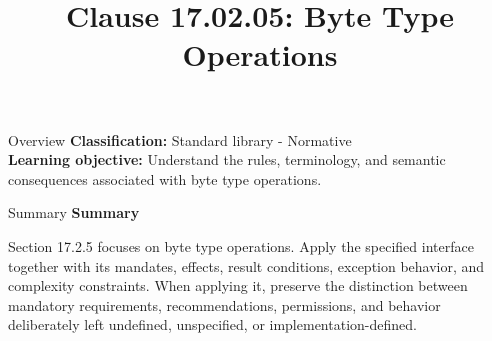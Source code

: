 \documentclass[10pt,letterpaper]{article}
\title{Clause 17.02.05: Byte Type Operations}
\author{}
\date{}
\begin{document}
\maketitle
\begin{CornellOverviewBox}{Overview}
\textbf{Classification:} Standard library - Normative\\[2pt]
\textbf{Learning objective:} Understand the rules, terminology, and semantic consequences associated with byte type operations.
\end{CornellOverviewBox}\begin{CornellSummaryBox}{Summary}
{\sffamily\bfseries\color{Accent} Summary}\par\vspace{3pt}Section 17.2.5 focuses on byte type operations. Apply the specified interface together with its mandates, effects, result conditions, exception behavior, and complexity constraints. When applying it, preserve the distinction between mandatory requirements, recommendations, permissions, and behavior deliberately left undefined, unspecified, or implementation-defined.
\end{CornellSummaryBox}
\end{document}
